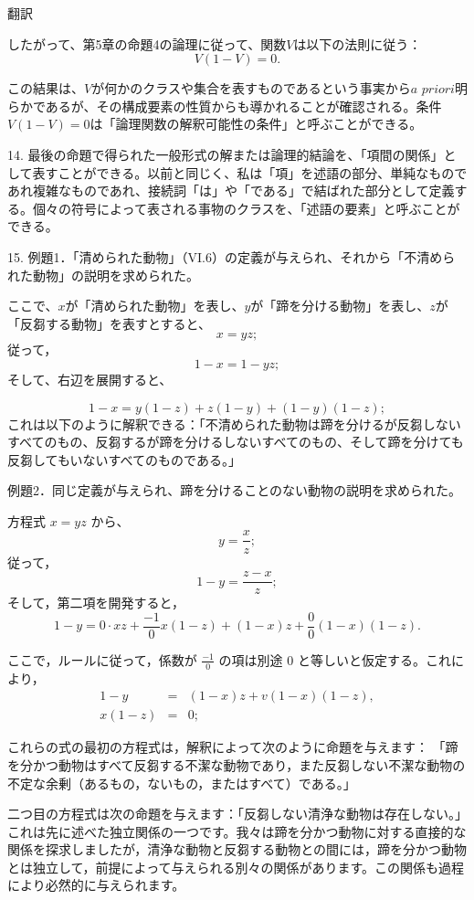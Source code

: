\documentclass[a4paper,11pt,openany]{ltjsbook}
\begin{document}
翻訳

したがって、第5章の命題4の論理に従って、関数$V$は以下の法則に従う：
\[
V(1-V) = 0.
\]

この結果は、$V$が何かのクラスや集合を表すものであるという事実から$\textit{a priori}$明らかであるが、その構成要素の性質からも導かれることが確認される。条件$V(1-V) = 0$は「論理関数の解釈可能性の条件」と呼ぶことができる。

14. 最後の命題で得られた一般形式の解または論理的結論を、「項間の関係」として表すことができる。以前と同じく、私は「項」を述語の部分、単純なものであれ複雑なものであれ、接続詞「は」や「である」で結ばれた部分として定義する。個々の符号によって表される事物のクラスを、「述語の要素」と呼ぶことができる。

15. 例題1．「清められた動物」（VI.6）の定義が与えられ、それから「不清められた動物」の説明を求められた。

ここで、$x$が「清められた動物」を表し、$y$が「蹄を分ける動物」を表し、$z$が「反芻する動物」を表すとすると、
\[
x = yz;
\]
従って，
\[
1-x = 1-yz ;
\]
そして、右辺を展開すると、

\[
     1-x = y(1-z)+z(1-y)+(1-y)(1-z);
\]
これは以下のように解釈できる：「不清められた動物は蹄を分けるが反芻しないすべてのもの、反芻するが蹄を分けるしないすべてのもの、そして蹄を分けても反芻してもいないすべてのものである。」

例題2．同じ定義が与えられ、蹄を分けることのない動物の説明を求められた。

方程式 $x = yz$ から、
\[
y = \frac{x}{z};
\]
従って，
\[
1 - y = \frac{z - x}{z};
\]
そして，第二項を開発すると，
\[
1 - y = 0 \cdot xz + \frac{-1}{0}x(1 - z) + (1 - x)z + \frac{0}{0}(1 - x)(1 - z).
\]

ここで，ルールに従って，係数が $\frac{-1}{0}$ の項は別途 $0$ と等しいと仮定する。これにより，
\begin{eqnarray*}
1 - y &=& (1 - x)z + v(1 - x)(1 - z),\\
x(1 - z) &=& 0;
\end{eqnarray*}

これらの式の最初の方程式は，解釈によって次のように命題を与えます：
「蹄を分かつ動物はすべて反芻する不潔な動物であり，また反芻しない不潔な動物の不定な余剰（あるもの，ないもの，またはすべて）である。」

二つ目の方程式は次の命題を与えます：「反芻しない清浄な動物は存在しない。」これは先に述べた独立関係の一つです。我々は蹄を分かつ動物に対する直接的な関係を探求しましたが，清浄な動物と反芻する動物との間には，蹄を分かつ動物とは独立して，前提によって与えられる別々の関係があります。この関係も過程により必然的に与えられます。
\end{document}
